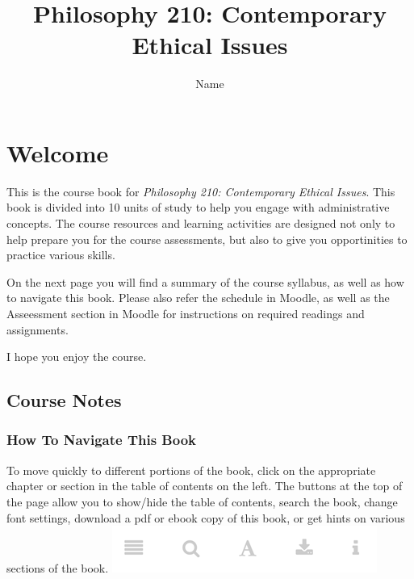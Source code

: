 \documentclass[
]{book}
\title{Philosophy 210: Contemporary Ethical Issues}
\author{Name}
\date{}
\begin{document}
\maketitle

{
\setcounter{tocdepth}{1}
\tableofcontents
}
\hypertarget{welcome}{%
\chapter*{Welcome}\label{welcome}}

This is the course book for \emph{Philosophy 210: Contemporary Ethical Issues}. This book is divided into 10 units of study to help you engage with administrative concepts. The course resources and learning activities are designed not only to help prepare you for the course assessments, but also to give you opportinities to practice various skills.

On the next page you will find a summary of the course syllabus, as well as how to navigate this book. Please also refer the schedule in Moodle, as well as the Asseessment section in Moodle for instructions on required readings and assignments.

I hope you enjoy the course.

\hypertarget{course-notes}{%
\section*{Course Notes}\label{course-notes}}

\hypertarget{how-to-navigate-this-book}{%
\subsection*{How To Navigate This Book}\label{how-to-navigate-this-book}}

To move quickly to different portions of the book, click on the appropriate chapter or section in the table of contents on the left. The buttons at the top of the page allow you to show/hide the table of contents, search the book, change font settings, download a pdf or ebook copy of this book, or get hints on various sections of the book.
\includegraphics{assets/course-intro/menu.png}
\end{document}
